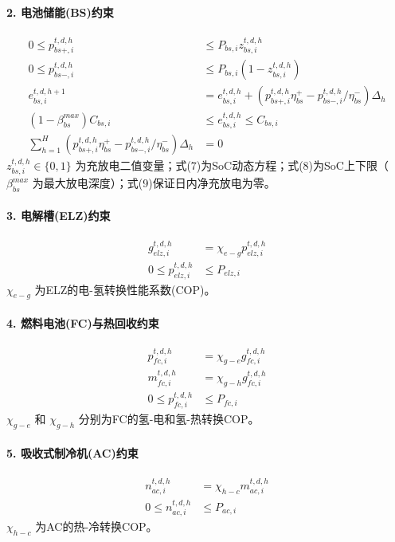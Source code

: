\documentclass[11pt]{ctexart}
\begin{document}
\paragraph{2. 电池储能(BS)约束}
\begin{align}
    0 \le p_{bs+,i}^{t,d,h} &\le P_{bs,i} z_{bs,i}^{t,d,h} \\
    0 \le p_{bs-,i}^{t,d,h} &\le P_{bs,i} (1 - z_{bs,i}^{t,d,h}) \\
    e_{bs,i}^{t,d,h+1} &= e_{bs,i}^{t,d,h} + (p_{bs+,i}^{t,d,h} \eta_{bs}^+ - p_{bs-,i}^{t,d,h} / \eta_{bs}^-) \Delta_h \\
    (1 - \beta_{bs}^{max}) C_{bs,i} &\le e_{bs,i}^{t,d,h} \le C_{bs,i} \\
    \sum_{h=1}^{H} (p_{bs+,i}^{t,d,h} \eta_{bs}^+ - p_{bs-,i}^{t,d,h} / \eta_{bs}^-) \Delta_h &= 0
\end{align}
$z_{bs,i}^{t,d,h} \in \{0,1\}$ 为充放电二值变量；式(7)为SoC动态方程；式(8)为SoC上下限（$\beta_{bs}^{max}$ 为最大放电深度）；式(9)保证日内净充放电为零。

\paragraph{3. 电解槽(ELZ)约束}
\begin{align}
    g_{elz,i}^{t,d,h} &= \chi_{e-g} p_{elz,i}^{t,d,h} \\
    0 \le p_{elz,i}^{t,d,h} &\le P_{elz,i}
\end{align}
$\chi_{e-g}$ 为ELZ的电-氢转换性能系数(COP)。

\paragraph{4. 燃料电池(FC)与热回收约束}
\begin{align}
    p_{fc,i}^{t,d,h} &= \chi_{g-e} g_{fc,i}^{t,d,h} \\
    m_{fc,i}^{t,d,h} &= \chi_{g-h} g_{fc,i}^{t,d,h} \\
    0 \le p_{fc,i}^{t,d,h} &\le P_{fc,i}
\end{align}
$\chi_{g-e}$ 和 $\chi_{g-h}$ 分别为FC的氢-电和氢-热转换COP。

\paragraph{5. 吸收式制冷机(AC)约束}
\begin{align}
    n_{ac,i}^{t,d,h} &= \chi_{h-c} m_{ac,i}^{t,d,h} \\
    0 \le n_{ac,i}^{t,d,h} &\le P_{ac,i}
\end{align}
$\chi_{h-c}$ 为AC的热-冷转换COP。
\end{document}
